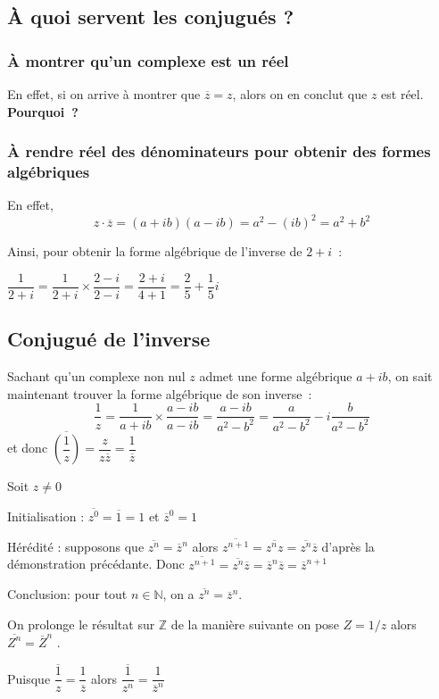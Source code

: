 \documentclass[french]{book}
\newcommand{\fr}[2]{\dfrac{#1}{#2}}
\newcommand{\cacheb}[1]{#1}
\begin{document}
\subsection{\`A quoi servent les conjugués ?}


\subsubsection{\`A montrer qu'un complexe est un réel}

En  effet, si  on arrive  à montrer  que $\overline{z}=z$,  alors  on en
conclut que $z$ est réel.\textbf{ Pourquoi~?}

\subsubsection{\`A rendre réel des dénominateurs pour obtenir des formes  algébriques} 

En
effet, $$z\cdot\overline{z}=(a+ib)(a-ib)=\cacheb{a^2-(ib)^2=a^2+b^2}$$ 


  \begin{exemple}[]
    Ainsi, pour obtenir la forme algébrique de l'inverse de $2+i$~: 

$\fr{1}{2+i}=\cacheb{\fr{1}{2+i}\times\fr{2-i}{2-i}=\fr{2+i}{4+1}=\fr{2}{5}+\fr{1}{5}i}$ 
    \end{exemple}
  

\subsection{Conjugué de l'inverse}


Sachant qu'un complexe non nul $z$ admet une forme algébrique $a+ib$, on
sait maintenant trouver la forme algébrique de son inverse~:
$$\dfrac{1}{z}=\dfrac{1}{a+ib}\times\dfrac{a-ib}{a-ib}=\dfrac{a-ib}{a^2-b^2}=\dfrac{a}{a^2-b^2}-i \dfrac{b}{a^2-b^2}$$
et donc $\overline{\left(\dfrac{1}{z}\right)}=\dfrac{z}{z \overline{z}}=\dfrac{1}{\overline{z}}$

\begin{demo}[$n\in \mathbb{Z}, \; \overline{z^n}=\overline{z}^n$ par "récurrence"]

Soit $z\neq 0$

Initialisation : $\overline{z^0}=\overline{1}=1$ et $ \overline{z}^0=1$


Hérédité : supposons que $\overline{z^n}=\overline{z}^n$ alors $\overline{z^{n+1}}=\overline{z^n z}=\overline{z^n} \overline{z}$ d'après la démonstration précédante.
Donc $\overline{z^{n+1}}=\overline{z^n}\overline{z}=\overline{z}^n \overline{z}=\overline{z}^{n+1}$



Conclusion: pour tout $n \in \mathbb{N}$, on a $  \overline{z^n}=\overline{z}^n$.

On prolonge le résultat sur $\mathbb{Z}$ de la manière suivante on pose $Z=1/z$
alors $\overline{Z^n}=\overline{Z}^n$ .

Puisque $\overline{\dfrac{1}{z}}=\dfrac{1}{\overline{z}}$ alors $\overline{\dfrac{1}{z^n}}=\dfrac{1}{\overline{z}^n}$ 

\end{demo}
\end{document}
